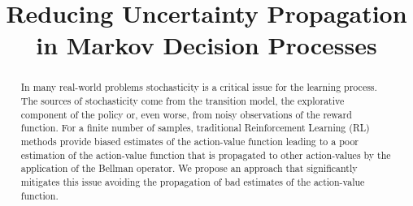 \documentclass[conference]{IEEEtran}
\begin{document}
\title{Reducing Uncertainty Propagation in Markov Decision Processes}


\author{
}

\maketitle

\begin{abstract}
In many real-world problems stochasticity is a critical issue for the learning process. The sources of stochasticity come from the transition model, the explorative component of the policy or, even worse, from noisy observations of the reward function. For a finite number of samples, traditional Reinforcement Learning (RL) methods provide biased estimates of the action-value function leading to a poor estimation of the action-value function that is propagated to other action-values by the application of the Bellman operator. We propose an approach that significantly mitigates this issue avoiding the propagation of bad estimates of the action-value function.
\end{abstract}



%
\IEEEpeerreviewmaketitle
\end{document}
